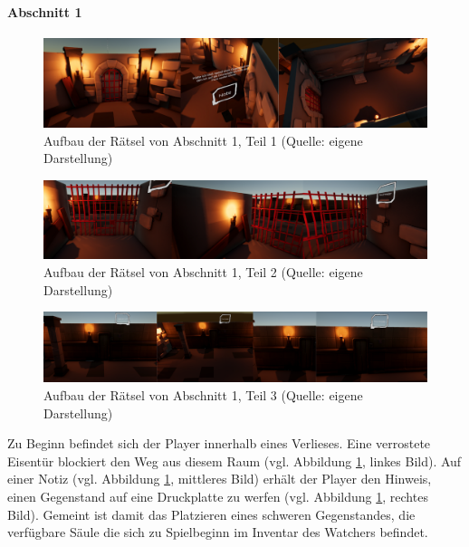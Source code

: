 \paragraph{Abschnitt 1}

\begin{figure}[ht]
\centering
\includegraphics[width=1\linewidth]{content/pictures/Rätseldesign - Abschnitt00 - Rätsel00.png}
\caption{Aufbau der Rätsel von Abschnitt 1, Teil 1 (Quelle: eigene Darstellung)}
\label{fig:riddle-design-section00-00}
\end{figure}

\begin{figure}[ht]
\centering
\includegraphics[width=1\linewidth]{content/pictures/Rätseldesign - Abschnitt00 - Rätsel01.png}
\caption{Aufbau der Rätsel von Abschnitt 1, Teil 2 (Quelle: eigene Darstellung)}
\label{fig:riddle-design-section00-01}
\end{figure}

\begin{figure}[ht]
\centering
\includegraphics[width=1\linewidth]{content/pictures/Rätseldesign - Abschnitt00 - Rätsel02.png}
\caption{Aufbau der Rätsel von Abschnitt 1, Teil 3 (Quelle: eigene Darstellung)}
\label{fig:riddle-design-section00-02}
\end{figure}

Zu Beginn befindet sich der Player innerhalb eines Verlieses. Eine verrostete Eisentür blockiert den Weg aus diesem Raum (vgl. Abbildung \ref{fig:riddle-design-section00-00}, linkes Bild). Auf einer Notiz (vgl. Abbildung \ref{fig:riddle-design-section00-00}, mittleres Bild) erhält der Player den Hinweis, einen Gegenstand auf eine Druckplatte zu werfen (vgl. Abbildung \ref{fig:riddle-design-section00-00}, rechtes Bild). Gemeint ist damit das Platzieren eines schweren Gegenstandes, die verfügbare Säule die sich zu Spielbeginn im Inventar des Watchers befindet.

